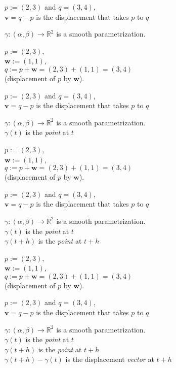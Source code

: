 \documentclass[twocolumn,20pt,fleqn]{extarticle}
\newcommand{\sep}{\vspace{0.5cm}}
\theoremstyle{plain}
\theoremstyle{definition}
\theoremstyle{remark}
\begin{document}
\sep
$p := (2,3)$ and $q=(3,4)$,\\
$\mathbf{v}= q - p$ is the displacement that takes $p$ to $q$ 
\sep

$\gamma : (\alpha,\beta) \to \mathbb{R}^2$ is a smooth parametrization.


\clearpage



$p := (2,3)$,\\ $\mathbf{w} := (1,1)$,\\ $q:=p + \mathbf{w} = (2,3) + (1,1) = (3,4)$ \\ (displacement of $p$ by $\mathbf{w}$).

\sep
$p := (2,3)$ and $q=(3,4)$,\\
$\mathbf{v}= q - p$ is the displacement that takes $p$ to $q$ 
\sep

$\gamma : (\alpha,\beta) \to \mathbb{R}^2$ is a smooth parametrization.\\
$\gamma(t)$ is the \emph{point} at $t$


\clearpage



$p := (2,3)$,\\ $\mathbf{w} := (1,1)$,\\ $q:=p + \mathbf{w} = (2,3) + (1,1) = (3,4)$ \\ (displacement of $p$ by $\mathbf{w}$).

\sep
$p := (2,3)$ and $q=(3,4)$,\\
$\mathbf{v}= q - p$ is the displacement that takes $p$ to $q$ 
\sep

$\gamma : (\alpha,\beta) \to \mathbb{R}^2$ is a smooth parametrization.\\
$\gamma(t)$ is the \emph{point} at $t$\\
$\gamma(t+h)$ is the \emph{point} at $t+h$


\clearpage



$p := (2,3)$,\\ $\mathbf{w} := (1,1)$,\\ $q:=p + \mathbf{w} = (2,3) + (1,1) = (3,4)$ \\ (displacement of $p$ by $\mathbf{w}$).

\sep
$p := (2,3)$ and $q=(3,4)$,\\
$\mathbf{v}= q - p$ is the displacement that takes $p$ to $q$ 
\sep

$\gamma : (\alpha,\beta) \to \mathbb{R}^2$ is a smooth parametrization.\\
$\gamma(t)$ is the \emph{point} at $t$\\
$\gamma(t+h)$ is the \emph{point} at $t+h$\\
$\gamma(t+h)-\gamma(t)$ is the displacement \emph{vector} at $t+h$
\end{document}
